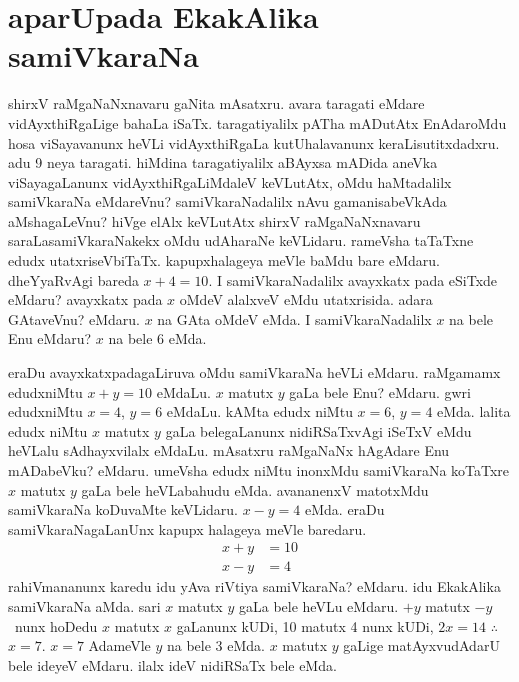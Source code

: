 \chapter{aparUpada EkakAlika samiVkaraNa}
\vskip -32pt

shirxV raMgaNaNxnavaru gaNita mAsatxru. avara taragati eMdare vidAyxthiRgaLige bahaLa iSaTx. taragatiyalilx pATha mADutAtx EnAdaroMdu hosa viSayavanunx heVLi vidAyxthiRgaLa kutUhalavanunx keraLisutitxdadxru. adu {\rm 9} neya taragati. hiMdina taragatiyalilx aBAyxsa mADida aneVka viSayagaLanunx vidAyxthiRgaLiMdaleV keVLutAtx, oMdu haMtadalilx samiVkaraNa eMdareVnu? samiVkaraNadalilx nAvu gamanisabeVkAda aMshagaLeVnu? hiVge elAlx keVLutAtx shirxV raMgaNaNxnavaru saraLasamiVkaraNakekx oMdu udAharaNe keVLidaru. rameVsha taTaTxne edudx utatxriseVbiTaTx. kapupxhalageya meVle baMdu bare eMdaru. dheYyaRvAgi bareda $x+4=10$. I samiVkaraNadalilx avayxkatx pada eSiTxde eMdaru? avayxkatx pada $x$ oMdeV alalxveV eMdu utatxrisida. adara GAtaveVnu? eMdaru. $x$ na GAta oMdeV eMda. I samiVkaraNadalilx $x$ na bele Enu eMdaru? $x$ na bele {\rm 6} eMda.

eraDu avayxkatxpadagaLiruva oMdu samiVkaraNa heVLi eMdaru. raMgamamx edudxniMtu $x+y=10$ eMdaLu. $x$ matutx $y$ gaLa bele Enu? eMdaru. gwri edudxniMtu $x=4$, $y=6$ eMdaLu. kAMta edudx niMtu $x=6$, $y=4$ eMda. lalita edudx niMtu \;$x$\; matutx $y$ gaLa belegaLanunx nidiRSaTxvAgi iSeTxV eMdu heVLalu sAdhayxvilalx eMdaLu. mAsatxru raMgaNaNx hAgAdare Enu mADabeVku? eMdaru. umeVsha edudx niMtu inonxMdu samiVkaraNa koTaTxre $x$ matutx $y$ gaLa bele heVLabahudu eMda. avananenxV matotxMdu samiVkaraNa koDuvaMte keVLidaru. $x-y=4$ eMda. eraDu samiVkaraNagaLanUnx kapupx halageya meVle baredaru.
\begin{align*}
x+y &=10\\[-3pt]
x-y &=4
\end{align*}
rahiVmananunx karedu idu yAva riVtiya samiVkaraNa? eMdaru. idu EkakAlika samiVkaraNa aMda. sari $x$ matutx $y$ gaLa bele heVLu eMdaru. $+y$ matutx $-y$~nunx hoDedu $x$ matutx $x$ gaLanunx kUDi, {\rm 10} matutx {\rm 4} nunx kUDi, $2x=14$\; $\therefore$ $x=7$.  $x=7$  AdameVle $y$ na bele {\rm 3} eMda. $x$ matutx $y$ gaLige matAyxvudAdarU bele ideyeV eMdaru. ilalx ideV nidiRSaTx bele eMda.

